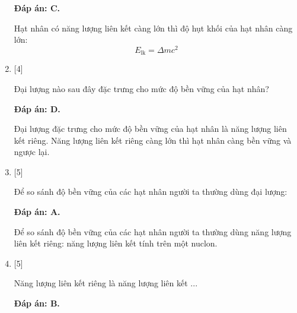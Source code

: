 \begin{enumerate}[label=\bfseries Câu \arabic*:]
	\loigiai
	{		\textbf{Đáp án: C.}
		
		Hạt nhân có năng lượng liên kết càng lớn thì độ hụt khối của hạt nhân càng lớn:
		$$E_\text{lk} = \Delta m c^2$$
		
	}
	\item {} [4]
	\cauhoi
	{Đại lượng nào sau đây đặc trưng cho mức độ bền vững của hạt nhân?
	}
	
	\loigiai
	{		\textbf{Đáp án: D.}
		
		Đại lượng đặc trưng cho mức độ bền vững của hạt nhân là năng lượng liên kết riêng. Năng lượng liên kết riêng càng lớn thì hạt nhân càng bền vững và ngược lại.
		
		
	}
	\item {} [5]
	\cauhoi
	{Để so sánh độ bền vững của các hạt nhân người ta thường dùng đại lượng:
	}
	
	\loigiai
	{		\textbf{Đáp án: A.}
		
		Để so sánh độ bền vững của các hạt nhân người ta thường dùng năng lượng liên kết riêng: năng lượng liên kết tính trên một nuclon.
		
	}
	\item {} [5]
	\cauhoi
	{Năng lượng liên kết riêng là năng lượng liên kết ...
	}
	
	\loigiai
	{		\textbf{Đáp án: B.}
		
}
\end{enumerate}
